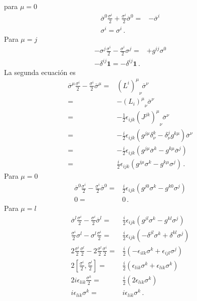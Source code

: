 para $\mu=0$
\begin{align*}
  \overline{\sigma}^{0}\frac{\sigma^i}{2} +\frac{\sigma^i}{2}\overline{\sigma}^{0}=&-\overline{\sigma}^i \nonumber\\
  \sigma^i=\sigma^i\,.
\end{align*}
Para $\mu=j$
\begin{align*}
  -\sigma^{j}\frac{\sigma^i}{2} -\frac{\sigma^i}{2}\sigma^j  =& +g^{ij}\sigma^0\nonumber\\
  -\delta^{ij}\mathbf{1}=-\delta^{ij}\mathbf{1}\,.
\end{align*}
La segunda ecuación es
\begin{align*}
\overline{\sigma}^{\mu} \frac{{\sigma^i}}{2}-\frac{{\sigma^i}}{2}\overline{\sigma}^{\mu}=&{\left(L^i  \right)^{\mu}}_{\nu}\overline{\sigma}^\nu \nonumber\\
 =&-{\left(L_i  \right)^{\mu}}_{\nu}\overline{\sigma}^\nu \nonumber\\
=&-\tfrac{1}{2}\epsilon_{ijk}{\left(J^{jk}  \right)^{\mu}}_{\nu}\overline{\sigma}^\nu \nonumber\\
 =&-\tfrac{i}{2}\epsilon_{ijk}\left(g^{j\mu}\delta^{k}_{\nu}-\delta^{j}_{\nu}g^{k\mu}  \right)\overline{\sigma}^\nu \nonumber\\
 =&-\tfrac{i}{2}\epsilon_{ijk}\left(g^{j\mu}\overline{\sigma}^k-g^{k\mu}\overline{\sigma}^j  \right) \nonumber\\
 =&\tfrac{i}{2}\epsilon_{ijk}\left(g^{j\mu}{\sigma}^k-g^{k\mu}{\sigma}^j  \right)\,.
\end{align*}
Para $\mu=0$
\begin{align*}
  \overline{\sigma}^{0} \frac{{\sigma^i}}{2}-\frac{{\sigma^i}}{2}\overline{\sigma}^{0}=& \frac{i}{2}\epsilon_{ijk}\left(g^{j0}{\sigma}^k-g^{k0}{\sigma}^j  \right)\nonumber\\
0=&0 \,.
\end{align*}
Para $\mu=l$
\begin{align*}
  \overline{\sigma}^l \frac{{\sigma^i}}{2}-\frac{{\sigma^i}}{2}\overline{\sigma}^l=&\frac{i}{2}\epsilon_{ijk}\left(g^{jl}{\sigma}^k-g^{kl}{\sigma}^j  \right)\nonumber\\
   \frac{{\sigma^i}}{2}{\sigma}^l -{\sigma}^l \frac{{\sigma^i}}{2}=&\frac{i}{2}\epsilon_{ijk}\left(-\delta^{jl}{\sigma}^k+\delta^{kl}{\sigma}^j  \right)\nonumber\\
  2\frac{\sigma^i}{2}\frac{\sigma^l}{2} -2\frac{\sigma^l}{2}\frac{\sigma^i}{2}=&\frac{i}{2}\left(-\epsilon_{ilk}{\sigma}^k+\epsilon_{ijl}{\sigma}^j  \right)\nonumber\\
 2\left[ \frac{\sigma^i}{2},\frac{\sigma^l}{2} \right]=&\frac{i}{2}\left(\epsilon_{lik}{\sigma}^k+\epsilon_{lik}{\sigma}^k  \right)\nonumber\\
 2i\epsilon_{lik}\frac{\sigma^{k}}{2}=&\frac{i}{2}\left(2\epsilon_{lik}  \sigma^{k}\right)\nonumber\\
 i\epsilon_{lik}{\sigma^{k}}=&i\epsilon_{lik}  \sigma^{k}\,.
\end{align*}


